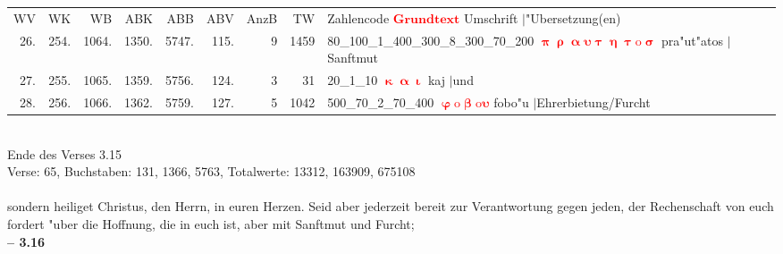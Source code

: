 \documentclass[a4paper,10pt,landscape]{article}
\begin{document}
\newpage
\begin{tabular}{rrrrrrrrp{120mm}}
WV&WK&WB&ABK&ABB&ABV&AnzB&TW&Zahlencode \textcolor{red}{$\boldsymbol{Grundtext}$} Umschrift $|$"Ubersetzung(en)\\
26.&254.&1064.&1350.&5747.&115.&9&1459&80\_100\_1\_400\_300\_8\_300\_70\_200 \textcolor{red}{$\boldsymbol{\uppi\uprho\upalpha\upsilon\uptau\upeta\uptau\mathrm{o}\upsigma}$} pra"ut"atos $|$Sanftmut\\
27.&255.&1065.&1359.&5756.&124.&3&31&20\_1\_10 \textcolor{red}{$\boldsymbol{\upkappa\upalpha\upiota}$} kaj $|$und\\
28.&256.&1066.&1362.&5759.&127.&5&1042&500\_70\_2\_70\_400 \textcolor{red}{$\boldsymbol{\upvarphi\mathrm{o}\upbeta\mathrm{o}\upsilon}$} fobo"u $|$Ehrerbietung/Furcht\\
\end{tabular}\medskip \\
Ende des Verses 3.15\\
Verse: 65, Buchstaben: 131, 1366, 5763, Totalwerte: 13312, 163909, 675108\\
\\
sondern heiliget Christus, den Herrn, in euren Herzen. Seid aber jederzeit bereit zur Verantwortung gegen jeden, der Rechenschaft von euch fordert "uber die Hoffnung, die in euch ist, aber mit Sanftmut und Furcht;\\
\newpage 
{\bf -- 3.16}\\
\medskip \\
\end{document}
